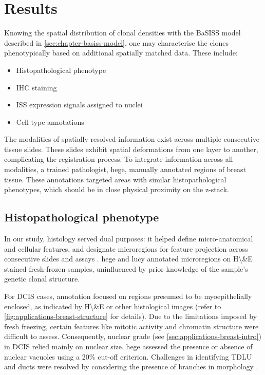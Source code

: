 \section{Results}

\label{sec:modalities-multimodal-results}

Knowing the spatial distribution of clonal densities with the BaSISS model described in \cref{sec:chapter-basiss-model}, one may characterise the clones phenotypically based on additional spatially matched data. These include:

\begin{itemize}
    \item Histopathological phenotype
    \item \ac{IHC} staining
    \item \ac{ISS} expression signals assigned to nuclei
    \item Cell type annotations
\end{itemize}


The modalities of spatially resolved information exist across multiple consecutive tissue slides. These slides exhibit spatial deformations from one layer to another, complicating the registration process. To integrate information across all modalities, a trained pathologist, \acf{hege}, manually annotated regions of breast tissue. These annotations targeted areas with similar histopathological phenotypes, which should be in close physical proximity on the z-stack.

\subsection{Histopathological phenotype}
\label{sec:modalities-histopath}

In our study, histology served dual purposes: it helped define micro-anatomical and cellular features, and designate microregions for feature projection across consecutive slides and assays . \acl{hege} and \acf{lucy} annotated microregions on \acf{H\&E} stained fresh-frozen samples, uninfluenced by prior knowledge of the sample's genetic clonal structure.

For \acf{DCIS} cases, annotation focused on regions presumed to be myoepithelially enclosed, as indicated by \ac{H\&E} or other histological images (refer to \cref{fig:applications-breast-structure} for details). Due to the limitations imposed by fresh freezing, certain features like mitotic activity and chromatin structure were difficult to assess. Consequently, nuclear grade (see \cref{sec:applications-breast-intro}) in \ac{DCIS} relied mainly on nuclear size. \acs{hege} assessed the presence or absence of nuclear vacuoles using a 20\% cut-off criterion. Challenges in identifying \ac{TDLU} and ducts were resolved by considering the presence of branches in morphology .

